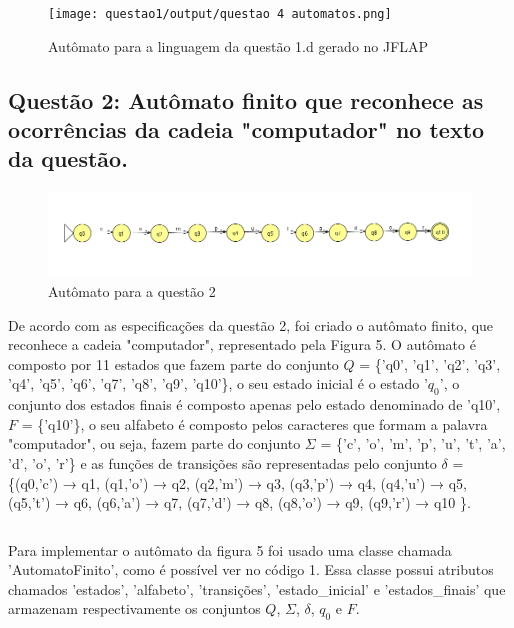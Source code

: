 \documentclass[12pt]{article}
\begin{document}
\begin{figure}[H]
\centering
\texttt{[image: questao1/output/questao 4 automatos.png]} 
\caption{Autômato para a linguagem da questão 1.d gerado no JFLAP}
\label{fig:regexExplanation}
\end{figure}

\subsection{Questão 2: Autômato finito que reconhece as ocorrências da cadeia "computador" no texto da questão.}

\begin{figure}[H]
\centering
\includegraphics[width=1.1\textwidth]{questao2/output/Questão 2 autômato.png} 
\caption{Autômato para a questão 2}
\label{fig:regexExplanation}
\end{figure}

De acordo com as especificações da questão 2, foi criado o autômato finito, que reconhece a cadeia "computador", representado pela Figura 5. O autômato é composto por 11 estados que fazem parte do conjunto $Q$ = \{'q0', 'q1', 'q2', 'q3', 'q4', 'q5', 'q6', 'q7', 'q8', 'q9', 'q10'\}, o seu estado inicial é o estado '$q_0$', o conjunto dos estados finais é composto apenas pelo estado denominado de 'q10', $F$ = \{'q10'\}, o seu alfabeto é composto pelos caracteres que formam a palavra "computador", ou seja, fazem parte do conjunto $\Sigma$ = \{'c', 'o', 'm', 'p', 'u', 't', 'a', 'd', 'o', 'r'\} e as funções de transições são representadas pelo conjunto $\delta$ = \{(q0,'c') → q1, (q1,'o') → q2, (q2,'m') → q3, (q3,'p') → q4, (q4,'u') → q5, (q5,'t') → q6, (q6,'a') → q7, (q7,'d') → q8, (q8,'o') → q9, (q9,'r') → q10 \}.


\begin{lstlisting}[style=Python, caption={Código da classe 'AutomatoFinito' da questão 2}]

\end{lstlisting}

Para implementar o autômato da figura 5 foi usado uma classe chamada 'AutomatoFinito', como é possível ver no código 1. Essa classe possui atributos chamados 'estados', 'alfabeto', 'transições', 'estado\_inicial' e 'estados\_finais' que armazenam respectivamente os conjuntos  $Q$, $\Sigma$, $\delta$, $q_0$ e $F$.
\end{document}

